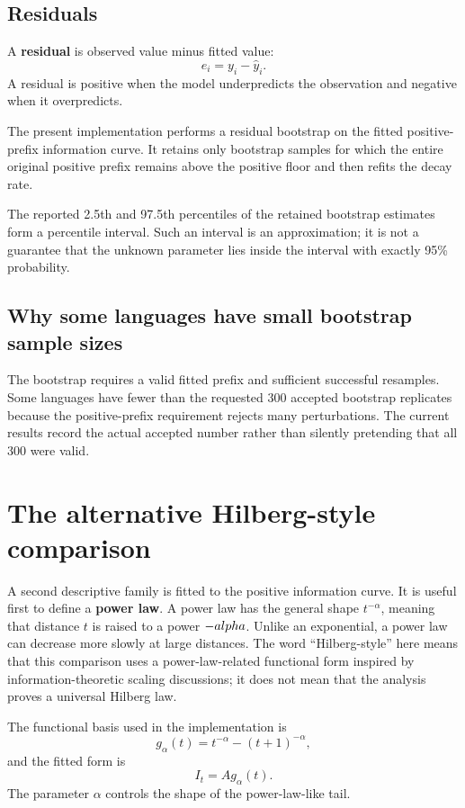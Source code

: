 \documentclass[11pt]{article}
\begin{document}
\subsection{Residuals}
A \textbf{residual} is observed value minus fitted value:
\[
e_i=y_i-\hat y_i.
\]
A residual is positive when the model underpredicts the observation and negative when it overpredicts.

The present implementation performs a residual bootstrap on the fitted positive-prefix information curve. It retains only bootstrap samples for which the entire original positive prefix remains above the positive floor and then refits the decay rate.

The reported 2.5th and 97.5th percentiles of the retained bootstrap estimates form a percentile interval. Such an interval is an approximation; it is not a guarantee that the unknown parameter lies inside the interval with exactly 95\% probability.

\subsection{Why some languages have small bootstrap sample sizes}
The bootstrap requires a valid fitted prefix and sufficient successful resamples. Some languages have fewer than the requested 300 accepted bootstrap replicates because the positive-prefix requirement rejects many perturbations. The current results record the actual accepted number rather than silently pretending that all 300 were valid.

\newpage
\section{The alternative Hilberg-style comparison}
A second descriptive family is fitted to the positive information curve. It is useful first to define a \textbf{power law}. A power law has the general shape $t^{-\alpha}$, meaning that distance $t$ is raised to a power $-\\alpha$. Unlike an exponential, a power law can decrease more slowly at large distances. The word ``Hilberg-style'' here means that this comparison uses a power-law-related functional form inspired by information-theoretic scaling discussions; it does not mean that the analysis proves a universal Hilberg law.

The functional basis used in the implementation is
\[
g_\alpha(t)=t^{-\alpha}-(t+1)^{-\alpha},
\]
and the fitted form is
\[
I_t=A g_\alpha(t).
\]
The parameter $\alpha$ controls the shape of the power-law-like tail.
\end{document}
